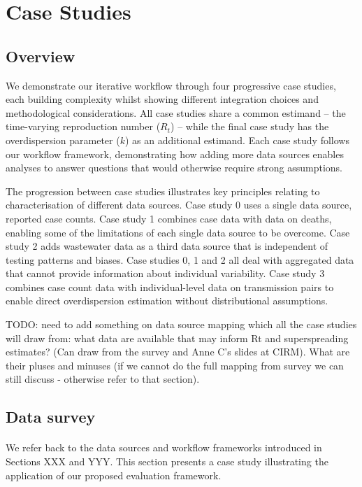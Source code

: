 \documentclass{article}
\begin{document}
\section{Case Studies}

\subsection{Overview}

We demonstrate our iterative workflow through four progressive case studies, each building complexity whilst showing different integration choices and methodological considerations.
All case studies share a common estimand -- the time-varying reproduction number ($R_t$) -- while the final case study has the overdispersion parameter ($k$) as an additional estimand. 
Each case study follows our workflow framework, demonstrating how adding more data sources enables analyses to answer questions that would otherwise require strong assumptions.

The progression between case studies illustrates key principles relating to characterisation of different data sources. Case study 0 uses a single data source, reported case counts. Case study 1 combines case data with data on deaths, enabling some of the limitations of each single data source to be overcome. Case study 2 adds wastewater data as a third data source that is independent of testing patterns and biases. Case studies 0, 1 and 2 all deal with aggregated data that cannot provide information about individual variability. Case study 3 combines case count data with individual-level data on transmission pairs to enable direct overdispersion estimation without distributional assumptions.


TODO: need to add something on data source mapping which all the case studies will draw from: what data are available that may inform Rt and superspreading estimates? (Can draw from the survey and Anne C's slides at CIRM). What are their pluses and minuses (if we cannot do the full mapping from survey we can still discuss - otherwise refer to that section).

\subsection{Data survey}

\paragraph{}We refer back to the data sources and workflow frameworks introduced in Sections XXX and YYY. This section presents a case study illustrating the application of our proposed evaluation framework. 
\end{document}
